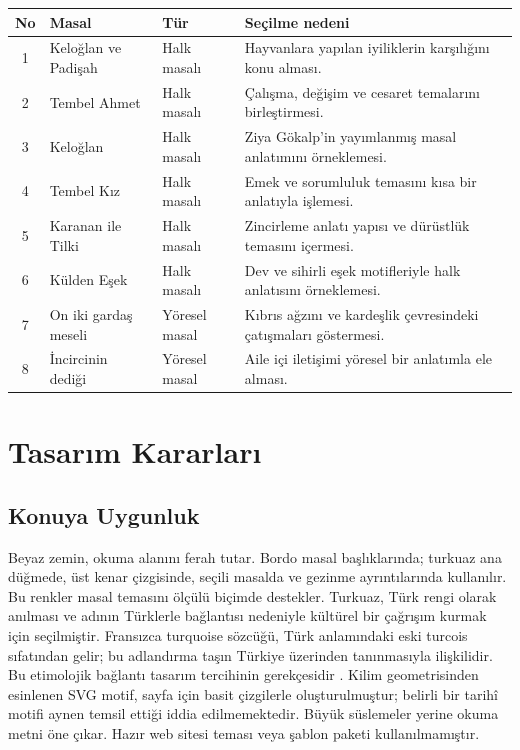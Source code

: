 \documentclass[12pt,a4paper]{article}
\begin{document}
\begin{longtable}{@{}cp{4cm}p{3cm}p{5.4cm}@{}}
\toprule
\textbf{No} & \textbf{Masal} & \textbf{Tür} & \textbf{Seçilme nedeni} \\
\midrule
\endhead
1 & Keloğlan ve Padişah & Halk masalı & Hayvanlara yapılan iyiliklerin karşılığını konu alması. \\
2 & Tembel Ahmet & Halk masalı & Çalışma, değişim ve cesaret temalarını birleştirmesi. \\
3 & Keloğlan & Halk masalı & Ziya Gökalp'in yayımlanmış masal anlatımını örneklemesi. \\
4 & Tembel Kız & Halk masalı & Emek ve sorumluluk temasını kısa bir anlatıyla işlemesi. \\
5 & Karanan ile Tilki & Halk masalı & Zincirleme anlatı yapısı ve dürüstlük temasını içermesi. \\
6 & Külden Eşek & Halk masalı & Dev ve sihirli eşek motifleriyle halk anlatısını örneklemesi. \\
7 & On iki gardaş meseli & Yöresel masal & Kıbrıs ağzını ve kardeşlik çevresindeki çatışmaları göstermesi. \\
8 & İncircinin dediği & Yöresel masal & Aile içi iletişimi yöresel bir anlatımla ele alması. \\
\bottomrule
\end{longtable}

\section{Tasarım Kararları}


\subsection{Konuya Uygunluk}
Beyaz zemin, okuma alanını ferah tutar. Bordo masal başlıklarında; turkuaz ana düğmede, üst kenar çizgisinde, seçili masalda ve gezinme ayrıntılarında kullanılır. Bu renkler masal temasını ölçülü biçimde destekler. Turkuaz, Türk rengi olarak anılması ve adının Türklerle bağlantısı nedeniyle kültürel bir çağrışım kurmak için seçilmiştir. Fransızca turquoise sözcüğü, Türk anlamındaki eski turcois sıfatından gelir; bu adlandırma taşın Türkiye üzerinden tanınmasıyla ilişkilidir. Bu etimolojik bağlantı tasarım tercihinin gerekçesidir \cite{renk}. Kilim geometrisinden esinlenen SVG motif,
sayfa için basit çizgilerle oluşturulmuştur; belirli bir tarihî motifi aynen
temsil ettiği iddia edilmemektedir. Büyük süslemeler yerine okuma metni öne çıkar.
Hazır web sitesi teması veya şablon paketi kullanılmamıştır.
\end{document}
